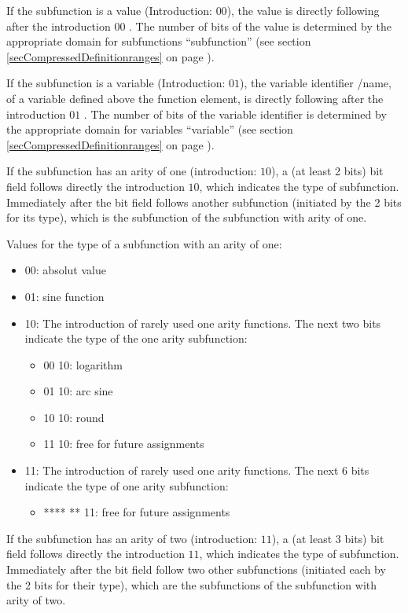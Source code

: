 If the subfunction is a value (Introduction: $00$), the value is directly following after the introduction $00$ . The number of bits of the value is determined by the appropriate domain for subfunctions ``subfunction'' (see section \ref{secCompressedDefinitionranges} on page \pageref{secCompressedDefinitionranges}).

If the subfunction is a variable (Introduction: $01$), the variable identifier /name, of a variable defined above the function element, is directly following after the introduction $01$ . The number of bits of the variable identifier is determined by the appropriate domain for variables ``variable'' (see section \ref{secCompressedDefinitionranges} on page \pageref{secCompressedDefinitionranges}).

\bigskip\noindent
If the subfunction has an arity of one (introduction: $10$), a (at least 2 bits) bit field follows directly the introduction $10$, which indicates the type of subfunction. Immediately after the bit field follows another subfunction (initiated by the 2 bits for its type), which is the subfunction of the subfunction with arity of one.

\bigskip\noindent
Values for the type of a subfunction with an arity of one:
\begin{itemize}
 \item 00: absolut value
 \item 01: sine function
 \item 10: The introduction of rarely used one arity functions. The next two bits indicate the type of the one arity subfunction:
 \begin{itemize}
  \item 00 10: logarithm
  \item 01 10: arc sine
  \item 10 10: round
  \item 11 10: free for future assignments
 \end{itemize}
 \item 11: The introduction of rarely used one arity functions. The next 6 bits indicate the type of one arity subfunction:
 \begin{itemize}
  \item **** ** 11: free for future assignments
 \end{itemize}
\end{itemize}

\bigskip\noindent
If the subfunction has an arity of two (introduction: $11$), a (at least 3 bits) bit field follows directly the introduction $11$, which indicates the type of subfunction. Immediately after the bit field follow two other subfunctions (initiated each by the 2 bits for their type), which are the subfunctions of the subfunction with arity of two.

